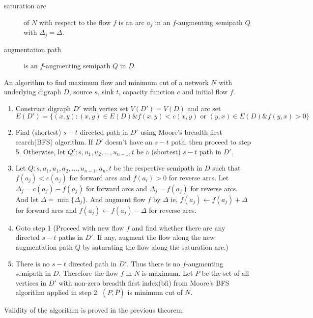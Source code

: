 \begin{description}
	\item[saturation arc] of $N$ with respect to the flow $f$ is an arc $a_j$ in an $f$-augmenting semipath $Q$ with $\Delta_j = \Delta$.
	\item[augmentation path] is an $f$-augmenting semipath $Q$ in $D$.
\end{description}

\begin{algorithm}
	An algorithm to find maximum flow and minimum cut of a network $N$ with underlying digraph $D$, source $s$, sink $t$, capacity function $c$ and initial flow $f$.
	\begin{enumerate}
		\item Construct digraph $D'$ with vertex set $V(D') = V(D)$ and arc set $E(D') = \{ (x,y) : (x,y) \in E(D) \&  f(x,y) < c(x,y) \text{ or } (y,x) \in E(D) \& f(y,x) > 0 \}$
		\item Find (shortest) $s-t$ directed path in $D'$ using Moore's breadth first search(BFS) algorithm.
			If $D'$ doesn't have an $s-t$ path, then proceed to step 5.
			Otherwise, let $Q' : s,u_1,u_2,\dots,u_{n-1},t$ be a (shortest) $s-t$ path in $D'$.
		\item Let $Q : s,a_1,u_1,a_2,\dots,u_{n-1},a_n,t$ be the respective semipath in $D$ such that $f(a_j) < c(a_j)$ for forward arcs and $f(a_i) > 0$ for reverse arcs.
			Let $\Delta_j = c(a_j) - f(a_j)$ for forward arcs and $\Delta_j = f(a_j)$ for reverse arcs.
			And let $\Delta = \min \{ \Delta_j \}$.
			And augment flow $f$ by $\Delta$ ie, $f(a_j) \leftarrow f(a_j) + \Delta$ for forward arcs and $f(a_j) \leftarrow f(a_j)-\Delta$ for reverse arcs.
		\item Goto step 1 (Proceed with new flow $f$ and find whether there are any directed $s-t$ paths in $D'$.
			If any, augment the flow along the new augmentation path $Q$ by saturating the flow along the saturation arc.)
		\item There is no $s-t$ directed path in $D'$.
			Thus there is no $f$-augmenting semipath in $D$.
			Therefore the flow $f$ in $N$ is maximum.
			Let $P$ be the set of all vertices in $D'$ with non-zero breadth first index(bfi) from Moore's BFS algorithm applied in step 2.
			$(P,\bar{P})$ is minimum cut of $N$.
	\end{enumerate}
\end{algorithm}

\begin{remark}
	Validity of the algorithm is proved in the previous theorem.
\end{remark}

